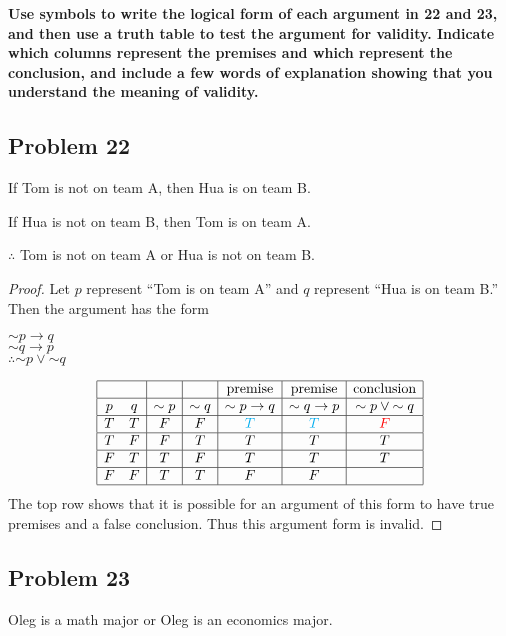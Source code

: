 \documentclass[14pt]{extarticle}
\begin{document}
{\bf \color{cyan} Use symbols to write the logical form of each argument in 22
and 23, and then use a truth table to test the argument for validity. Indicate
which columns represent the premises and which represent the conclusion, and
include a few words of explanation showing that you understand the meaning of
validity.}

\subsection{Problem 22}
If Tom is not on team A, then Hua is on team B.

If Hua is not on team B, then Tom is on team A.

$\therefore$ Tom is not on team A or Hua is not on team B.

\begin{proof}
Let $p$ represent “Tom is on team A” and $q$ represent “Hua is on team B.” Then
the argument has the form

\begin{center}
${\sim p} \to q$ \\
${\sim q} \to p$ \\
$\therefore {\sim p} \vee {\sim q}$ \\
\end{center}

$$
\begin{array}{|cc|c|c|c|c|c|}
\hline
&&&& \text{premise} & \text{premise} & \text{conclusion} \\
\hline
p & q & {\sim p} & {\sim q} & {\sim p} \to q & {\sim q} \to p & {\sim p} \vee
{\sim q} \\
\hline
T & T & F & F & \color{cyan}T & \color{cyan}T & \color{red}F \\
\hline
T & F & F & T & T & T & T \\
\hline
F & T & T & F & T & T & T \\
\hline
F & F & T & T & F & F &   \\
\hline
\end{array}
$$
The top row shows that it is possible for an argument of this form to have true
premises and a false conclusion. Thus this argument form is invalid.
\end{proof}

\subsection{Problem 23}
Oleg is a math major or Oleg is an economics major.
\end{document}
